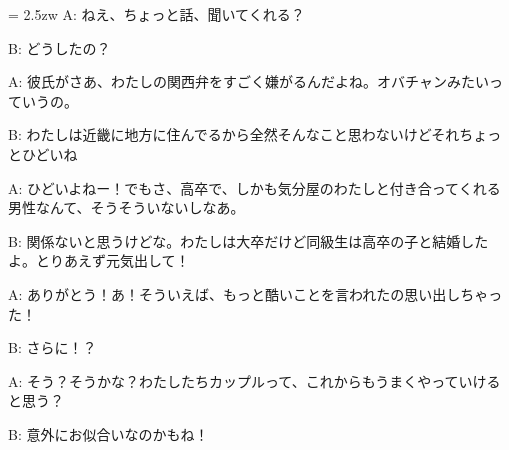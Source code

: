 \documentclass[11pt]{amsart}
\title{}
\author{}
\newenvironment{hangall}[1]{\hangindent = 2.5zw\everypar{\hangindent = 2.5zw}}{}
\begin{document}
\maketitle
\begin{hangall}{}%
A: ねえ、ちょっと話、聞いてくれる？



B: どうしたの？



A: 彼氏がさあ、わたしの関西弁をすごく嫌がるんだよね。オバチャンみたいっていうの。



B: わたしは近畿に地方に住んでるから全然そんなこと思わないけどそれちょっとひどいね



A: ひどいよねー！でもさ、高卒で、しかも気分屋のわたしと付き合ってくれる男性なんて、そうそういないしなあ。



B: 関係ないと思うけどな。わたしは大卒だけど同級生は高卒の子と結婚したよ。とりあえず元気出して！



A: ありがとう！あ！そういえば、もっと酷いことを言われたの思い出しちゃった！



B: さらに！？



A: そう？そうかな？わたしたちカップルって、これからもうまくやっていけると思う？



B: 意外にお似合いなのかもね！\end{hangall}
\end{document}
